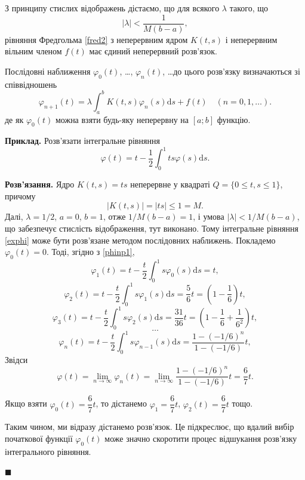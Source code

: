 \documentclass[14pt,twoside]{extreport}
\theoremstyle{mystyle}
\numberwithin{equation}{chapter}
\begin{document}
З принципу стислих відображень дістаємо, що для всякого $\lambda$ такого, що
\[
 |\lambda|<\dfrac{1}{M(b-a)},
\]
рівняння Фредгольма \eqref{fred2} з неперервним ядром $K(t, s)$ і неперервним вільним членом $f(t)$ має єдиний неперервний розв'язок.

Послідовні наближення $\varphi_0(t)$, \ldots, $\varphi_n(t)$, \ldots до цього розв'язку визначаються зі співвідношень
\begin{equation}\label{phinp1}
 \varphi_{n+1}(t)=\lambda \int_{a}^{b} K(t, s) \varphi_n(s)\mathrm{d}s + f(t) \quad (n=0, 1, \ldots).
\end{equation}
де як $\varphi_0(t)$ можна взяти будь-яку неперервну на $[a; b]$ функцію.

\begin{small}
\textbf{Приклад.} Розв'язати інтегральне рівняння
\begin{equation}\label{exphi}
 \varphi(t) = t - \dfrac{1}{2} \int_0^1 ts \varphi(s) \mathrm{d}s.
\end{equation}

\textbf{Розв'язання.} Ядро $K(t, s)=ts$ неперервне у квадраті $Q=\{0\leqslant t, s \leqslant 1\}$, причому
\[
 |K(t, s)| = |ts| \leqslant 1 = M.
\]
Далі, $\lambda = 1/2$, $a = 0$, $b = 1$, отже $1/M(b - a) = 1$, і умова $|\lambda| < 1/M(b - a)$, що забезпечує стислість відображення, тут виконано. Тому інтегральне рівняння \eqref{exphi} може бути розв'язане методом послідовних наближень. Покладемо $\varphi_0 (t) = 0$. Тоді, згідно з \eqref{phinp1},
\[
 \varphi_1(t) = t - \dfrac{t}{2}\int_0^1 s\varphi_0(s)\mathrm{d}s = t,
\]
\[
 \varphi_2(t) = t - \dfrac{t}{2}\int_0^1 s\varphi_1(s)\mathrm{d}s = \dfrac{5}{6} t = \left( 1 - \dfrac{1}{6} \right) t,
\]
\[
 \varphi_3(t) = t - \dfrac{t}{2}\int_0^1 s\varphi_2(s)\mathrm{d}s = \dfrac{31}{36} t = \left( 1 - \dfrac{1}{6} + \dfrac{1}{6^2}\right) t,
\]
\[
 \ldots
\]
\[
 \varphi_n(t) = t - \dfrac{t}{2}\int_0^1 s\varphi_{n-1}(s)\mathrm{d}s = \dfrac{1-(-1/6)^n}{1-(-1/6)} t,
\]
Звідси
\begin{equation}
 \varphi(t) = \lim\limits_{n\to\infty} \varphi_n(t) = \lim\limits_{n\to\infty} \dfrac{1-(-1/6)^n}{1-(-1/6)} t = \dfrac{6}{7} t.
\end{equation}

Якщо взяти $\varphi_0(t) = \dfrac{6}{7} t$, то дістанемо $\varphi_1 = \dfrac{6}{7} t$, $\varphi_2(t) = \dfrac{6}{7} t$ тощо.

Таким чином, ми відразу дістанемо розв'язок. Це підкреслює, що вдалий вибір початкової функції $\varphi_0(t)$ може значно скоротити процес відшукання розв'язку інтегрального рівняння.

$\blacksquare$
\end{small}
\end{document}
